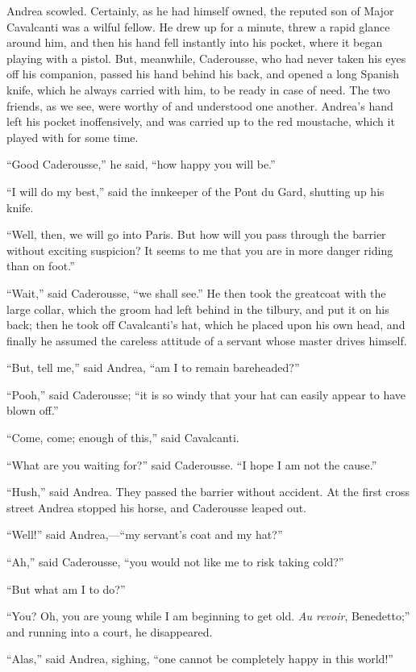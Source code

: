 Andrea scowled. Certainly, as he had himself owned, the reputed son of
Major Cavalcanti was a wilful fellow. He drew up for a minute, threw a
rapid glance around him, and then his hand fell instantly into his
pocket, where it began playing with a pistol. But, meanwhile,
Caderousse, who had never taken his eyes off his companion, passed his
hand behind his back, and opened a long Spanish knife, which he always
carried with him, to be ready in case of need. The two friends, as we
see, were worthy of and understood one another. Andrea’s hand left his
pocket inoffensively, and was carried up to the red moustache, which it
played with for some time.

“Good Caderousse,” he said, “how happy you will be.”

“I will do my best,” said the innkeeper of the Pont du Gard, shutting
up his knife.

“Well, then, we will go into Paris. But how will you pass through the
barrier without exciting suspicion? It seems to me that you are in more
danger riding than on foot.”

“Wait,” said Caderousse, “we shall see.” He then took the greatcoat
with the large collar, which the groom had left behind in the tilbury,
and put it on his back; then he took off Cavalcanti’s hat, which he
placed upon his own head, and finally he assumed the careless attitude
of a servant whose master drives himself.

“But, tell me,” said Andrea, “am I to remain bareheaded?”

“Pooh,” said Caderousse; “it is so windy that your hat can easily
appear to have blown off.”

“Come, come; enough of this,” said Cavalcanti.

“What are you waiting for?” said Caderousse. “I hope I am not the
cause.”

“Hush,” said Andrea. They passed the barrier without accident. At the
first cross street Andrea stopped his horse, and Caderousse leaped out.

“Well!” said Andrea,—“my servant’s coat and my hat?”

“Ah,” said Caderousse, “you would not like me to risk taking cold?”

“But what am I to do?”

“You? Oh, you are young while I am beginning to get old. \textit{Au revoir},
Benedetto;” and running into a court, he disappeared.

“Alas,” said Andrea, sighing, “one cannot be completely happy in this
world!”
